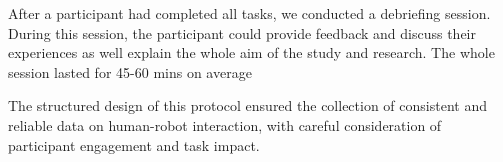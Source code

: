  After a participant had completed all tasks, we conducted a debriefing session. During this session, the participant could provide feedback and discuss their experiences as well explain the whole aim of the study and research. The whole session lasted for 45-60 mins on average 

The structured design of this protocol ensured the collection of consistent and reliable data on human-robot interaction, with careful consideration of participant engagement and task impact.